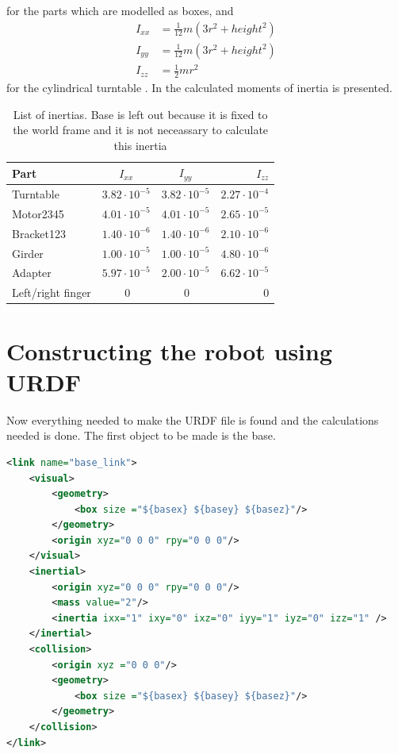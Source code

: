 for the parts which are modelled as boxes, and 
\begin{align*}
    I_{xx} &= \frac{1}{12}m(3r^2+height^2)\\
    I_{yy} &= \frac{1}{12}m(3r^2+height^2)\\
    I_{zz} &= \frac{1}{2}mr^2
\end{align*}
for the cylindrical turntable \cite{Dupac}. In  the calculated moments of inertia is presented. 

\begin{table}[htbp]
\centering
\caption{List of inertias. Base is left out because it is fixed to the world frame and it is not neceassary to calculate this inertia}
\label{table:inertia}
    \begin{tabular}{l c c r}
        \toprule
        Part  &  $I_{xx}$ & $I_{yy}$ & $I_{zz}$\\
        \midrule
        Turntable & $3.82\cdot10^{-5}$ &  $3.82\cdot10^{-5}$ &$2.27\cdot10^{-4}$\\
        Motor2345 & $4.01\cdot10^{-5}$  & $4.01\cdot10^{-5}$  & $2.65\cdot10^{-5}$ \\
        Bracket123 & $1.40\cdot10^{-6} $ & $1.40\cdot10^{-6} $ & $2.10\cdot10^{-6} $ \\
        Girder & $1.00\cdot10^{-5} $ & $1.00\cdot10^{-5} $ & $4.80\cdot10^{-6} $\\
        Adapter & $5.97\cdot10^{-5} $ & $2.00\cdot10^{-5} $ & $6.62\cdot10^{-5} $\\
        Left/right finger & $~0$ & $~0$ & $0$\\
        \bottomrule
    \end{tabular}
\end{table}

\section{Constructing the robot using URDF}\label{sec:makingurdf}
Now everything needed to make the URDF file is found and the calculations needed is done. The first object to be made is the base\cite{ROSWiki,GazeboURDF}.
\begin{lstlisting}[language=xml,caption={URDF code for the base},label={lst:base}]
<link name="base_link">
    <visual>
        <geometry>
            <box size ="${basex} ${basey} ${basez}"/>
        </geometry>
        <origin xyz="0 0 0" rpy="0 0 0"/>
    </visual>
    <inertial>
        <origin xyz="0 0 0" rpy="0 0 0"/>
        <mass value="2"/>
        <inertia ixx="1" ixy="0" ixz="0" iyy="1" iyz="0" izz="1" />
    </inertial>
    <collision>
        <origin xyz ="0 0 0"/>
        <geometry>
            <box size ="${basex} ${basey} ${basez}"/>
        </geometry>
    </collision>
</link>
\end{lstlisting}

